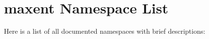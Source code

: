 \section{maxent Namespace List}
Here is a list of all documented namespaces with brief descriptions:\begin{CompactList}
\item{}
\end{CompactList}
